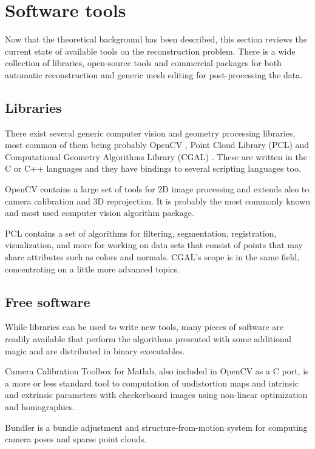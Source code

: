 \section{Software tools}

Now that the theoretical background has been described, this section reviews the current state of available tools on the reconstruction problem. There is a wide collection of libraries, open-source tools and commercial packages for both automatic reconstruction and generic mesh editing for post-processing the data.

\subsection{Libraries}

There exist several generic computer vision and geometry processing libraries, most common of them being probably OpenCV \cite{opencv}, Point Cloud Library (PCL) \cite{pcl} and Computational Geometry Algorithms Library (CGAL) \cite{cgal}. These are written in the C or C++ languages and they have bindings to several scripting languages too.

OpenCV contains a large set of tools for 2D image processing and extends also to camera calibration and 3D reprojection.
It is probably the most commonly known and most used computer vision algorithm package.

PCL contains a set of algorithms for filtering, segmentation, registration, visualization, and more for working on data sets that consist of points that may share attributes such as colors and normals. CGAL's scope is in the same field, concentrating on a little more advanced topics.

\subsection{Free software}

While libraries can be used to write new tools, many pieces of software are readily available that perform the algorithms presented with some additional magic and are distributed in binary executables.

Camera Calibration Toolbox for Matlab, also included in OpenCV as a C port, is a more or less standard tool to computation of undistortion maps and intrinsic and extrinsic parameters with checkerboard images using non-linear optimization and homographies. \cite{camcalmatlab}

Bundler is a bundle adjustment and structure-from-motion system for computing camera poses and sparse point clouds. \cite{snavely2006photo}

